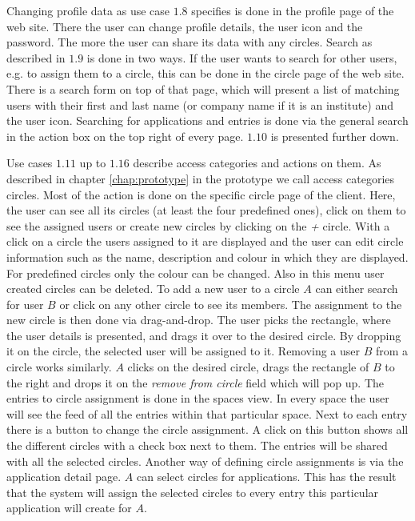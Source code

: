 Changing profile data as use case $1.8$ specifies is done in the profile page of the web site. There the user can change profile details, the user icon and the password. The more the user can share its data with any circles.\newline
Search as described in $1.9$ is done in two ways. If the user wants to search for other users, e.g. to assign them to a circle, this can be done in the circle page of the web site. There is a search form on top of that page, which will present a list of matching users with their first and last name (or company name if it is an institute) and the user icon. Searching for applications and entries is done via the general search in the action box on the top right of every page. $1.10$ is presented further down.

Use cases $1.11$ up to $1.16$ describe access categories and actions on them. As described in chapter \ref{chap:prototype} in the prototype we call access categories circles. Most of the action is done on the specific circle page of the client. Here, the user can see all its circles (at least the four predefined ones), click on them to see the assigned users or create new circles by clicking on the \emph{+} circle. With a click on a circle the users assigned to it are displayed and the user can edit circle information such as the name, description and colour in which they are displayed. For predefined circles only the colour can be changed. Also in this menu user created circles can be deleted. To add a new user to a circle $A$ can either search for user $B$ or click on any other circle to see its members. The assignment to the new circle is then done via drag-and-drop. The user picks the rectangle, where the user details is presented, and drags it over to the desired circle. By dropping it on the circle, the selected user will be assigned to it. Removing a user $B$ from a circle works similarly. $A$ clicks on the desired circle, drags the rectangle of $B$ to the right and drops it on the \emph{remove from circle} field which will pop up. \newline
The entries to circle assignment is done in the spaces view. In every space the user will see the feed of all the entries within that particular space. Next to each entry there is a button to change the circle assignment. A click on this button shows all the different circles with a check box next to them. The entries will be shared with all the selected circles. Another way of defining circle assignments is via the application detail page. $A$ can select circles for applications. This has the result that the system will assign the selected circles to every entry this particular application will create for $A$.

